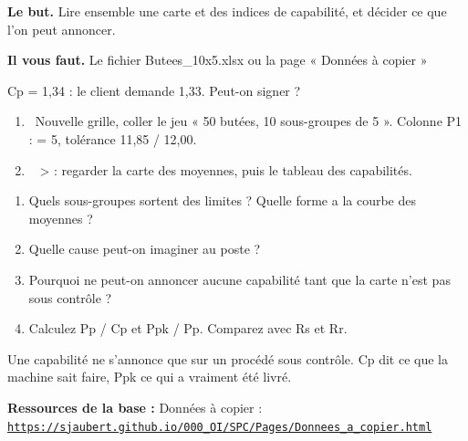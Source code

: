 \documentclass[10pt,a4paper]{article}
\begin{document}
\thispagestyle{fancy}
\begin{tcolorbox}[boite]\textbf{Le but.} Lire ensemble une carte et des indices de capabilité, et décider ce que l'on peut annoncer.\par\textbf{Il vous faut.} Le fichier Butees\_10x5.xlsx ou la page « Données à copier »\end{tcolorbox}
\begin{tcolorbox}[pred]Cp = 1,34 : le client demande 1,33. Peut-on signer ?\reponse\end{tcolorbox}
\begin{enumerate}[label=\textcolor{cyan}{\textbf{\arabic*.}},leftmargin=15pt,itemsep=1.5pt]
\item \tagE\ Nouvelle grille, coller le jeu « 50 butées, 10 sous-groupes de 5 ». Colonne P1 :  = 5, tolérance 11,85 / 12,00.
\item \tagE\  >  : regarder la carte des moyennes, puis le tableau des capabilités.
\end{enumerate}
\par
{}
\begin{enumerate}[label=\textcolor{cyan}{\textbf{Q\arabic*.}},leftmargin=22pt]
\item Quels sous-groupes sortent des limites ? Quelle forme a la courbe des moyennes ?\reponse[2]
\item Quelle cause peut-on imaginer au poste ?\reponse[1]
\item Pourquoi ne peut-on annoncer aucune capabilité tant que la carte n'est pas sous contrôle ?\reponse[2]
\item Calculez Pp / Cp et Ppk / Pp. Comparez avec Rs et Rr.\reponse[1]
\end{enumerate}
\begin{tcolorbox}[retenir]Une capabilité ne s'annonce que sur un procédé sous contrôle. Cp dit ce que la machine sait faire, Ppk ce qui a vraiment été livré.\end{tcolorbox}
\vfill{\footnotesize\color{uimm}\textbf{Ressources de la base :} Données à copier : \href{https://sjaubert.github.io/000_OI/SPC/Pages/Donnees_a_copier.html\#butees10}{\nolinkurl{https://sjaubert.github.io/000_OI/SPC/Pages/Donnees_a_copier.html}}}
\end{document}
